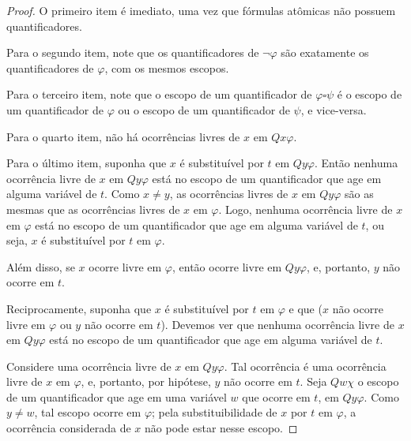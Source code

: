 \begin{proof}
    O primeiro item é imediato, uma vez que fórmulas atômicas não possuem quantificadores.

    Para o segundo item, note que os quantificadores de $\neg \varphi$ são exatamente os quantificadores de $\varphi$, com os mesmos escopos.
    
    Para o terceiro item, note que o escopo de um quantificador de $\varphi \square \psi$ é o escopo de um quantificador de $\varphi$ ou o escopo de um quantificador de $\psi$, e vice-versa.

    Para o quarto item, não há ocorrências livres de $x$ em $Qx\varphi$.

    Para o último item, suponha que $x$ é substituível por $t$ em $Qy\varphi$.
    Então nenhuma ocorrência livre de $x$ em $Qy\varphi$ está no escopo de um quantificador que age em alguma variável de $t$.
    Como $x\neq y$, as ocorrências livres de $x$ em $Qy\varphi$ são as mesmas que as ocorrências livres de $x$ em $\varphi$.
    Logo, nenhuma ocorrência livre de $x$ em $\varphi$ está no escopo de um quantificador que age em alguma variável de $t$, ou seja, $x$ é substituível por $t$ em $\varphi$.

    Além disso, se $x$ ocorre livre em $\varphi$, então ocorre livre em $Qy\varphi$, e, portanto, $y$ não ocorre em $t$.

    Reciprocamente, suponha que $x$ é substituível por $t$ em $\varphi$ e que ($x$ não ocorre livre em $\varphi$ ou $y$ não ocorre em $t$).
    Devemos ver que nenhuma ocorrência livre de $x$ em $Qy\varphi$ está no escopo de um quantificador que age em alguma variável de $t$.

    Considere uma ocorrência livre de $x$ em $Qy\varphi$.
    Tal ocorrência é uma ocorrência livre de $x$ em $\varphi$, e, portanto, por hipótese, $y$ não ocorre em $t$.
    Seja $Qw\chi$ o escopo de um quantificador que age em uma variável $w$ que ocorre em $t$, em $Qy\varphi$.
    Como $y\neq w$, tal escopo ocorre em $\varphi$; pela substituibilidade de $x$ por $t$ em $\varphi$, a ocorrência considerada de $x$ não pode estar nesse escopo.
\end{proof}

